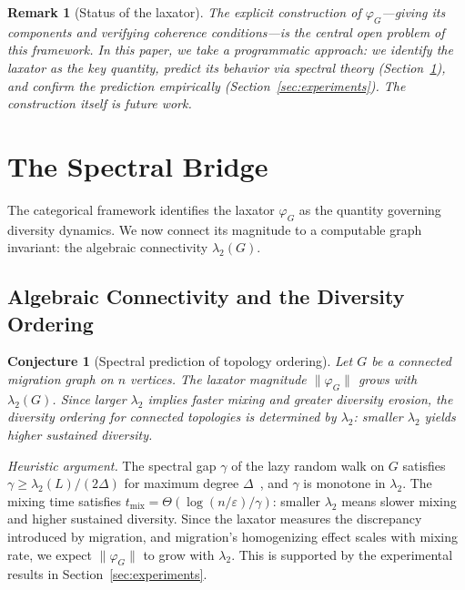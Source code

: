 \documentclass[submission,copyright,creativecommons]{eptcs}
\newtheorem{conjecture}{Conjecture}
\newtheorem{remark}{Remark}
\begin{document}
\begin{remark}[Status of the laxator]
\label{rem:laxator-status}
The explicit construction of $\varphi_G$---giving its components and
verifying coherence conditions---is the central open problem of this
framework. In this paper, we take a programmatic approach: we identify
the laxator as the key quantity, predict its behavior via spectral
theory (Section~\ref{sec:spectral}), and confirm the prediction
empirically (Section~\ref{sec:experiments}). The construction itself
is future work.
\end{remark}

\section{The Spectral Bridge}
\label{sec:spectral}

The categorical framework identifies the laxator $\varphi_G$ as the
quantity governing diversity dynamics. We now connect its magnitude
to a computable graph invariant: the algebraic connectivity
$\lambda_2(G)$.

\subsection{Algebraic Connectivity and the Diversity Ordering}

\begin{conjecture}[Spectral prediction of topology ordering]
\label{prop:spectral}
Let $G$ be a connected migration graph on $n$ vertices.
The laxator magnitude $\|\varphi_G\|$ grows with
$\lambda_2(G)$. Since larger $\lambda_2$ implies faster mixing
and greater diversity erosion, the diversity ordering for
connected topologies is determined by $\lambda_2$: smaller
$\lambda_2$ yields higher sustained diversity.
\end{conjecture}

\noindent\textit{Heuristic argument.}
The spectral gap $\gamma$ of the lazy random walk on $G$ satisfies
$\gamma \geq \lambda_2(L)/(2\Delta)$ for maximum degree
$\Delta$~\cite{levin2009markov}, and $\gamma$ is monotone in
$\lambda_2$. The mixing time satisfies
$t_{\mathrm{mix}} = \Theta(\log(n/\varepsilon)/\gamma)$: smaller
$\lambda_2$ means slower mixing and higher sustained diversity.
Since the laxator measures the discrepancy introduced by
migration, and migration's homogenizing effect scales with
mixing rate, we expect $\|\varphi_G\|$ to grow with $\lambda_2$.
This is supported by the experimental results in
Section~\ref{sec:experiments}.
\end{document}

